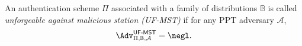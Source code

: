 An authentication scheme $\Pi$ associated with a family of distributions $\mathbb{B}$ is called \emph{unforgeable against malicious station (UF-MST)} if for any PPT adversary $\mathcal{A}$,
\[
	\Adv^{\textsf{UF-MST}}_{\Pi, \mathbb{B}, \mathcal{A}} = \negl.
\]



\fi

%





